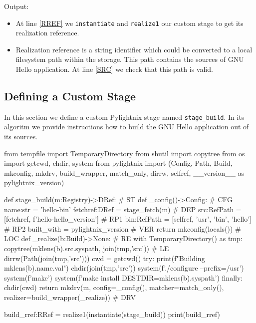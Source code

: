 Output:

\mysmallstdout

\begin{itemize}

  \item At line \ref{RREF} we \texttt{instantiate} and \texttt{realize1} our
    custom stage to get its realization reference.

  \item Realization reference is a string identifier which could be converted to
    a local filesystem path within the storage. This path contains the sources
    of GNU Hello application. At line \ref{SRC} we check that this path is
    valid.

\end{itemize}

\pagebreak
\subsection{Defining a Custom Stage}

In this section we define a custom Pylightnix stage named \texttt{stage\_build}.
In its algoritm we provide instructions how to build the GNU Hello application
out of its sources.

\begin{pythontexcode}
from tempfile import TemporaryDirectory
from shutil import copytree
from os import getcwd, chdir, system
from pylightnix import (Config, Path, Build, mkconfig, mkdrv,
  build_wrapper, match_only, dirrw, selfref,
  __version__ as pylightnix_version)

def stage_build(m:Registry)->DRef:                           # ST \label{ST}
  def _config()->Config:                                    # CFG \label{CFG}
    name:str = 'hello-bin'
    fetchref:DRef = stage_fetch(m)                          # DEP \label{DEP}
    src:RefPath = [fetchref, f'hello-{hello_version}']      # RP1 \label{RP1}
    bin:RefPath = [selfref, 'usr', 'bin', 'hello']          # RP2 \label{RP2}
    built_with = pylightnix_version                         # VER \label{VER}
    return mkconfig(locals())                               # LOC \label{LOC}
  def _realize(b:Build)->None:                              # RE \label{RE}
    with TemporaryDirectory() as tmp:
      copytree(mklens(b).src.syspath, join(tmp,'src'))      # LE \label{LE}
      dirrw(Path(join(tmp,'src')))
      cwd = getcwd()
      try:
        print(f"Building {mklens(b).name.val}")
        chdir(join(tmp,'src'))
        system(f'./configure --prefix=/usr')
        system(f'make')
        system(f'make install DESTDIR={mklens(b).syspath}')
      finally:
        chdir(cwd)
  return mkdrv(m, config=_config(),
                  matcher=match_only(),
                  realizer=build_wrapper(_realize))          # DRV \label{DRV}

build_rref:RRef = realize1(instantiate(stage_build))
print(build_rref)
\end{pythontexcode}

